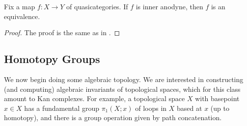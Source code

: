 \documentclass[../notes.tex]{subfiles}
\begin{document}
\begin{proposition}
	Fix a map $f\colon X\to Y$ of quasicategories. If $f$ is inner anodyne, then $f$ is an equivalence.
\end{proposition}
\begin{proof}
	The proof is the same as in .
\end{proof}

\subsection{Homotopy Groups}
We now begin doing some algebraic topology. We are interested in constructing (and computing) algebraic invariants of topological spaces, which for this class amount to Kan complexes. For example, a topological space $X$ with basepoint $x\in X$ has a fundamental group $\pi_1(X;x)$ of loops in $X$ based at $x$ (up to homotopy), and there is a group operation given by path concatenation.
\end{document}
